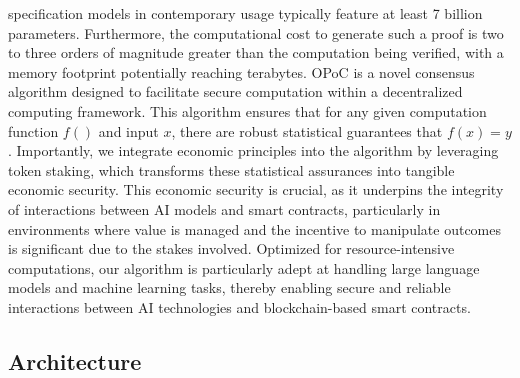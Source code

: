 \documentclass{article}
\begin{document}
specification models in contemporary usage typically feature at least 7 billion parameters. Furthermore,
the computational cost to generate such a proof is two to three orders of magnitude greater than the
computation being verified, with a memory footprint potentially reaching terabytes. 
OPoC is a novel consensus algorithm designed to facilitate secure computation within a decentralized computing framework. This algorithm ensures that for any given computation function \( f() \) and input \( x \), there are robust statistical guarantees that \( f(x) = y \). Importantly, we integrate economic principles into the algorithm by leveraging token staking, which transforms these statistical assurances into tangible economic security. This economic security is crucial, as it underpins the integrity of interactions between AI models and smart contracts, particularly in environments where value is managed and the incentive to manipulate outcomes is significant due to the stakes involved. Optimized for resource-intensive computations, our algorithm is particularly adept at handling large language models and machine learning tasks, thereby enabling secure and reliable interactions between AI technologies and blockchain-based smart contracts.

\subsection{Architecture}
\end{document}
